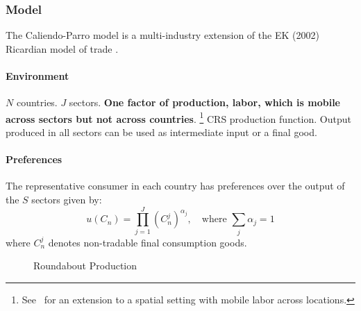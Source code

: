 \subsubsection{Model}
The Caliendo-Parro model is a multi-industry extension of the EK (2002) Ricardian model of trade \citep{Antras:2022}.
\paragraph{Environment}
$N$ countries.
$J$ sectors.
\textbf{One factor of production, labor, which is mobile across sectors but not across countries}.%
\footnote{
    See~\cite{Caliendo:2018} for an extension to a spatial setting with mobile labor across locations.
}
CRS production function.
Output produced in all sectors can be used as intermediate input or a final good.

\paragraph{Preferences}
The representative consumer in each country has preferences over the output of the $S$ sectors given by:
\begin{equation}
    u(C_n) = \prod_{j=1}^J \left(C_n^j \right)^{\alpha_j}, \quad \text{where } \sum_{j} \alpha_j = 1
\end{equation}
where $C_n^j$ denotes non-tradable final consumption goods.

\begin{figure}[h!]
    \centering
    \caption{Roundabout Production}
\end{figure}

